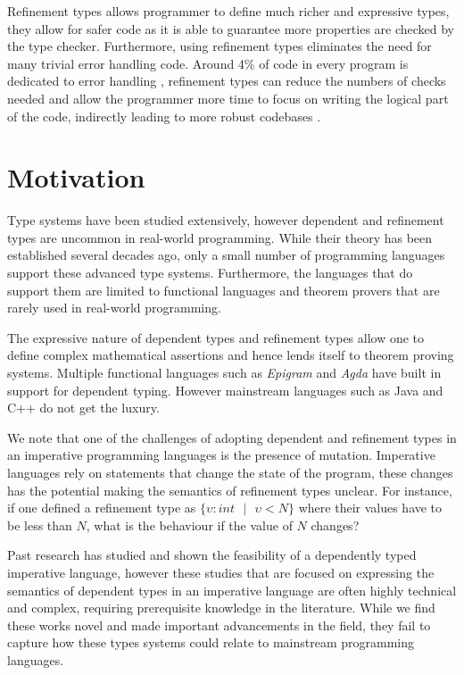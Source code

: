 \documentclass[a4paper,12pt]{report}
\begin{document}
\par
Refinement types allows programmer to define much richer and expressive types, 
they allow for safer code as it is able to guarantee more properties are 
checked by the type checker. Furthermore, using refinement types 
eliminates the need for many trivial error handling code. Around 4\% of 
code in every program is dedicated to error handling \cite{errorHandlingCode}, 
refinement types can reduce the numbers of checks needed and allow the 
programmer more time to focus on writing the logical part of the code, indirectly 
leading to more robust codebases \cite{elimArrayCheck}.

\section{Motivation}
Type systems have been studied extensively, however dependent and refinement types 
are uncommon in real-world programming. While their theory has been 
established several decades ago, only a small number of programming languages 
support these advanced type systems. Furthermore, the languages that do support 
them are limited to functional languages and theorem provers that are rarely 
used in real-world programming.

\par
The expressive nature of dependent types and refinement types allow one to 
define complex mathematical assertions and hence lends itself to 
theorem proving systems. Multiple functional languages such as \textit{Epigram} 
\cite{epigram} and \textit{Agda} \cite{agda} have 
built in support for dependent typing. However 
mainstream languages such as Java and C++ do not get the luxury.

\par
We note that one of the challenges of adopting dependent and refinement types 
in an imperative programming languages is the presence of mutation. Imperative 
languages rely on statements that change the state of the program, these 
changes has the potential making the semantics of refinement types unclear. 
For instance, if one defined a refinement type as 
$\{\upsilon : int\text{ }|\text{ }\upsilon < N\}$ where their values have to be 
less than $N$, what is the behaviour if the value of $N$ changes?

\par
Past research has studied and shown the feasibility of a dependently typed 
imperative language, however these studies that are focused on expressing 
the semantics of dependent types in an imperative language are often highly 
technical and complex, requiring prerequisite knowledge in the literature. While 
we find these works novel and made important advancements in the field, 
they fail to capture how these types systems could relate to 
mainstream programming languages.
\end{document}
